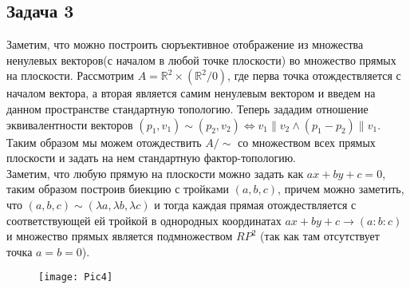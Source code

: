 \subsection*{Задача 3}
	Заметим, что можно построить сюръективное отображение из множества ненулевых векторов(с началом в любой точке плоскости) во множество прямых на плоскости. Рассмотрим $A = \mathbb{R}^2 \times (\mathbb{R}^2 \slash 0)$, где перва точка отождествляется с началом вектора, а вторая является самим ненулевым вектором и введем на данном пространстве стандартную топологию. Теперь зададим отношение эквивалентности векторов $(p_1,v_1) \sim (p_2,v_2) \Leftrightarrow v_1 \parallel v_2 \wedge (p_1-p_2) \parallel v_1$. Таким образом мы можем отождествить $A  \slash \sim$ со множеством всех прямых плоскости и задать на нем стандартную фактор-топологию.\\
	Заметим, что любую прямую на плоскости можно задать как $ax + by + c =0$, таким образом построив биекцию с тройками $(a,b,c)$, причем можно заметить, что $(a,b,c) \sim (\lambda a, \lambda b, \lambda c)$ и тогда каждая прямая отождествляется с соответствующей ей тройкой в однородных координатах $ax + by + c \to (a:b:c)$ и множество прямых является подмножеством $RP^2$ (так как там отсутствует точка $a=b=0$).\\
	
	\begin{figure}[!h]
		\texttt{[image: Pic4]}
	\end{figure}

\newpage
